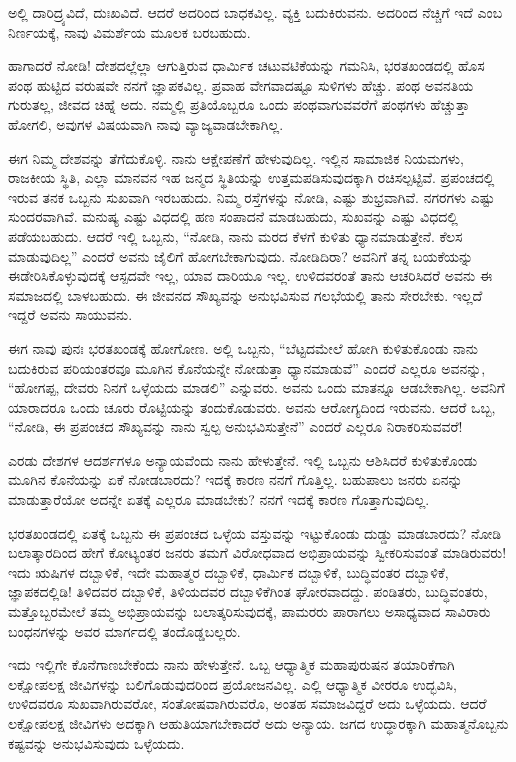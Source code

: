 ಅಲ್ಲಿ ದಾರಿದ್ರ್ಯವಿದೆ, ದುಃಖವಿದೆ. ಆದರೆ ಅದರಿಂದ ಬಾಧಕವಿಲ್ಲ. ವ್ಯಕ್ತಿ ಬದುಕಿರುವನು. ಅದರಿಂದ ನೆಚ್ಚಿಗೆ ಇದೆ ಎಂಬ ನಿರ್ಣಯಕ್ಕೆ, ನಾವು ವಿಮರ್ಶೆಯ ಮೂಲಕ ಬರಬಹುದು.

ಹಾಗಾದರೆ ನೋಡಿ! ದೇಶದಲ್ಲೆಲ್ಲಾ ಆಗುತ್ತಿರುವ ಧಾರ್ಮಿಕ ಚಟುವಟಿಕೆಯನ್ನು ಗಮನಿಸಿ, ಭರತಖಂಡದಲ್ಲಿ ಹೊಸ ಪಂಥ ಹುಟ್ಟಿದ ವರುಷವೇ ನನಗೆ ಜ್ಞಾಪಕವಿಲ್ಲ. ಪ್ರವಾಹ ವೇಗವಾದಷ್ಟೂ ಸುಳಿಗಳು ಹೆಚ್ಚು. ಪಂಥ ಅವನತಿಯ ಗುರುತಲ್ಲ, ಜೀವದ ಚಿಹ್ನೆ ಅದು. ನಮ್ಮಲ್ಲಿ ಪ್ರತಿಯೊಬ್ಬರೂ ಒಂದು ಪಂಥವಾಗುವವರೆಗೆ ಪಂಥಗಳು ಹೆಚ್ಚುತ್ತಾ ಹೋಗಲಿ, ಅವುಗಳ ವಿಷಯವಾಗಿ ನಾವು ವ್ಯಾಜ್ಯವಾಡಬೇಕಾಗಿಲ್ಲ.

ಈಗ ನಿಮ್ಮ ದೇಶವನ್ನು ತೆಗೆದುಕೊಳ್ಳಿ. ನಾನು ಆಕ್ಷೇಪಣೆಗೆ ಹೇಳುವುದಿಲ್ಲ. ಇಲ್ಲಿನ ಸಾಮಾಜಿಕ ನಿಯಮಗಳು, ರಾಜಕೀಯ ಸ್ಥಿತಿ, ಎಲ್ಲಾ ಮಾನವನ ಇಹ ಜನ್ಮದ ಸ್ಥಿತಿಯನ್ನು ಉತ್ತಮಪಡಿಸುವುದಕ್ಕಾಗಿ ರಚಿಸಲ್ಪಟ್ಟಿವೆ. ಪ್ರಪಂಚದಲ್ಲಿ ಇರುವ ತನಕ ಒಬ್ಬನು ಸುಖವಾಗಿ ಇರಬಹುದು. ನಿಮ್ಮ ರಸ್ತೆಗಳನ್ನು ನೋಡಿ, ಎಷ್ಟು ಶುಭ್ರವಾಗಿವೆ. ನಗರಗಳು ಎಷ್ಟು ಸುಂದರವಾಗಿವೆ. ಮನುಷ್ಯ ಎಷ್ಟು ವಿಧದಲ್ಲಿ ಹಣ ಸಂಪಾದನೆ ಮಾಡಬಹುದು, ಸುಖವನ್ನು ಎಷ್ಟು ವಿಧದಲ್ಲಿ ಪಡೆಯಬಹುದು. ಆದರೆ ಇಲ್ಲಿ ಒಬ್ಬನು, “ನೋಡಿ, ನಾನು ಮರದ ಕೆಳಗೆ ಕುಳಿತು ಧ್ಯಾನಮಾಡುತ್ತೇನೆ. ಕೆಲಸ ಮಾಡುವುದಿಲ್ಲ” ಎಂದರೆ ಅವನು ಜೈಲಿಗೆ ಹೋಗಬೇಕಾಗುವುದು. ನೋಡಿದಿರಾ? ಅವನಿಗೆ ತನ್ನ ಬಯಕೆಯನ್ನು ಈಡೇರಿಸಿಕೊಳ್ಳುವುದಕ್ಕೆ ಆಸ್ಪದವೇ ಇಲ್ಲ, ಯಾವ ದಾರಿಯೂ ಇಲ್ಲ. ಉಳಿದವರಂತೆ ತಾನು ಆಚರಿಸಿದರೆ ಅವನು ಈ ಸಮಾಜದಲ್ಲಿ ಬಾಳಬಹುದು. ಈ ಜೀವನದ ಸೌಖ್ಯವನ್ನು ಅನುಭವಿಸುವ ಗಲಭೆಯಲ್ಲಿ ತಾನು ಸೇರಬೇಕು. ಇಲ್ಲದೆ ಇದ್ದರೆ ಅವನು ಸಾಯುವನು.

ಈಗ ನಾವು ಪುನಃ ಭರತಖಂಡಕ್ಕೆ ಹೋಗೋಣ. ಅಲ್ಲಿ ಒಬ್ಬನು, “ಬೆಟ್ಟದಮೇಲೆ ಹೋಗಿ ಕುಳಿತುಕೊಂಡು ನಾನು ಬದುಕಿರುವ ಪರಿಯಂತರವೂ ಮೂಗಿನ ಕೊನೆಯನ್ನೇ ನೋಡುತ್ತಾ ಧ್ಯಾನಮಾಡುವೆ” ಎಂದರೆ ಎಲ್ಲರೂ ಅವನನ್ನು, “ಹೋಗಪ್ಪ, ದೇವರು ನಿನಗೆ ಒಳ್ಳೆಯದು ಮಾಡಲಿ” ಎನ್ನುವರು. ಅವನು ಒಂದು ಮಾತನ್ನೂ ಆಡಬೇಕಾಗಿಲ್ಲ. ಅವನಿಗೆ ಯಾರಾದರೂ ಒಂದು ಚೂರು ರೊಟ್ಟಿಯನ್ನು ತಂದುಕೊಡುವರು. ಅವನು ಆರೋಗ್ಯದಿಂದ ಇರುವನು. ಆದರೆ ಒಬ್ಬ, “ನೋಡಿ, ಈ ಪ್ರಪಂಚದ ಸೌಖ್ಯವನ್ನು ನಾನು ಸ್ವಲ್ಪ ಅನುಭವಿಸುತ್ತೇನೆ” ಎಂದರೆ ಎಲ್ಲರೂ ನಿರಾಕರಿಸುವವರೆ!

ಎರಡು ದೇಶಗಳ ಆದರ್ಶಗಳೂ ಅನ್ಯಾಯವೆಂದು ನಾನು ಹೇಳುತ್ತೇನೆ. ಇಲ್ಲಿ ಒಬ್ಬನು ಆಶಿಸಿದರೆ ಕುಳಿತುಕೊಂಡು ಮೂಗಿನ ಕೊನೆಯನ್ನು ಏಕೆ ನೋಡಬಾರದು? ಇದಕ್ಕೆ ಕಾರಣ ನನಗೆ ಗೊತ್ತಿಲ್ಲ. ಬಹುಪಾಲು ಜನರು ಏನನ್ನು ಮಾಡುತ್ತಾರೆಯೋ ಅದನ್ನೇ ಏತಕ್ಕೆ ಎಲ್ಲರೂ ಮಾಡಬೇಕು? ನನಗೆ ಇದಕ್ಕೆ ಕಾರಣ ಗೊತ್ತಾಗುವುದಿಲ್ಲ.

ಭರತಖಂಡದಲ್ಲಿ ಏತಕ್ಕೆ ಒಬ್ಬನು ಈ ಪ್ರಪಂಚದ ಒಳ್ಳೆಯ ವಸ್ತುವನ್ನು ಇಟ್ಟುಕೊಂಡು ದುಡ್ಡು ಮಾಡಬಾರದು? ನೋಡಿ ಬಲಾತ್ಕಾರದಿಂದ ಹೇಗೆ ಕೋಟ್ಯಂತರ ಜನರು ತಮಗೆ ವಿರೋಧವಾದ ಅಭಿಪ್ರಾಯವನ್ನು ಸ್ವೀಕರಿಸುವಂತೆ ಮಾಡಿರುವರು! ಇದು ಋಷಿಗಳ ದಬ್ಬಾಳಿಕೆ, ಇದೇ ಮಹಾತ್ಮರ ದಬ್ಬಾಳಿಕೆ, ಧಾರ್ಮಿಕ ದಬ್ಬಾಳಿಕೆ, ಬುದ್ಧಿವಂತರ ದಬ್ಬಾಳಿಕೆ, ಜ್ಞಾಪಕದಲ್ಲಿಡಿ! ತಿಳಿದವರ ದಬ್ಬಾಳಿಕೆ, ತಿಳಿಯದವರ ದಬ್ಬಾಳಿಕೆಗಿಂತ ಘೋರವಾದದ್ದು. ಪಂಡಿತರು, ಬುದ್ಧಿವಂತರು, ಮತ್ತೊಬ್ಬರಮೇಲೆ ತಮ್ಮ ಅಭಿಪ್ರಾಯವನ್ನು ಬಲಾತ್ಕರಿಸುವುದಕ್ಕೆ, ಪಾಮರರು ಪಾರಾಗಲು ಅಸಾಧ್ಯವಾದ ಸಾವಿರಾರು ಬಂಧನಗಳನ್ನು ಅವರ ಮಾರ್ಗದಲ್ಲಿ ತಂದೊಡ್ಡಬಲ್ಲರು.

ಇದು ಇಲ್ಲಿಗೇ ಕೊನೆಗಾಣಬೇಕೆಂದು ನಾನು ಹೇಳುತ್ತೇನೆ. ಒಬ್ಬ ಆಧ್ಯಾತ್ಮಿಕ ಮಹಾಪುರುಷನ ತಯಾರಿಕೆಗಾಗಿ ಲಕ್ಷೋಪಲಕ್ಷ ಜೀವಿಗಳನ್ನು ಬಲಿಗೊಡುವುದರಿಂದ ಪ್ರಯೋಜನವಿಲ್ಲ. ಎಲ್ಲಿ ಆಧ್ಯಾತ್ಮಿಕ ವೀರರೂ ಉದ್ಭವಿಸಿ, ಉಳಿದವರೂ ಸುಖವಾಗಿರುವರೋ, ಸಂತೋಷವಾಗಿರುವರೊ, ಅಂತಹ ಸಮಾಜವಿದ್ದರೆ ಅದು ಒಳ್ಳೆಯದು. ಆದರೆ ಲಕ್ಷೋಪಲಕ್ಷ ಜೀವಿಗಳು ಅದಕ್ಕಾಗಿ ಆಹುತಿಯಾಗಬೇಕಾದರೆ ಅದು ಅನ್ಯಾಯ. ಜಗದ ಉದ್ಧಾರಕ್ಕಾಗಿ ಮಹಾತ್ಮನೊಬ್ಬನು ಕಷ್ಟವನ್ನು ಅನುಭವಿಸುವುದು ಒಳ್ಳೆಯದು.

